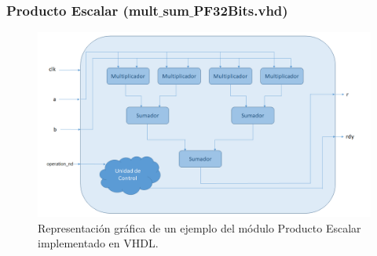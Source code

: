 \subsubsection{Producto Escalar (mult$\_$sum$\_$PF32Bits.vhd)}

\begin{figure}
  \centering
    \includegraphics[width=1\textwidth]{Imagenes/DiagramaModuloProductoEscalar.png}
  \caption{Representación gráfica de un ejemplo del módulo Producto Escalar implementado en VHDL.}
  \label{fig:modulo producto escalar vhdl}
\end{figure}

